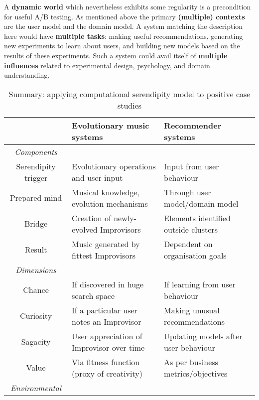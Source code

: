 A \textbf{dynamic world} which nevertheless exhibits some regularity
is a precondition for useful A/B testing.  As mentioned above the
primary \textbf{(multiple) contexts} are the user model and the domain
model.  A system matching the description here would have
\textbf{multiple tasks}: making useful recommendations, generating new
experiments to learn about users, and building new models based on the
results of these experiments.  Such a system could avail itself of
\textbf{multiple influences} related to experimental design,
psychology, and domain understanding.

\begin{table}[ht]%
\caption{Summary: applying computational serendipity model to positive case studies}
\begin{center}
\footnotesize
\begin{tabular}{|c|l|l|}
\hline
  & Evolutionary music systems & Recommender systems \\
\hline
\hline
{\em Components} && \\
\hline
\hline
Serendipity trigger & Evolutionary operations and user input & Input from user behaviour \\
\hline
Prepared mind  & Musical knowledge, evolution mechanisms & Through user model/domain model \\
\hline
Bridge  & Creation of newly-evolved Improvisors & Elements identified outside clusters \\
\hline
Result & Music generated by fittest Improvisors& Dependent on organisation goals \\
\hline
\hline
{\em Dimensions} && \\
\hline
\hline
Chance & If discovered in huge search space & If learning from user behaviour \\
\hline
Curiosity & If a particular user notes an Improvisor & Making unusual recommendations \\
\hline
Sagacity & User appreciation of Improvisor over time & Updating models after user behaviour \\
\hline
Value & Via fitness function (proxy of creativity) & As per business metrics/objectives \\
\hline
\hline
{\em Environmental} && \\

\end{tabular}
\end{center}
\end{table}
